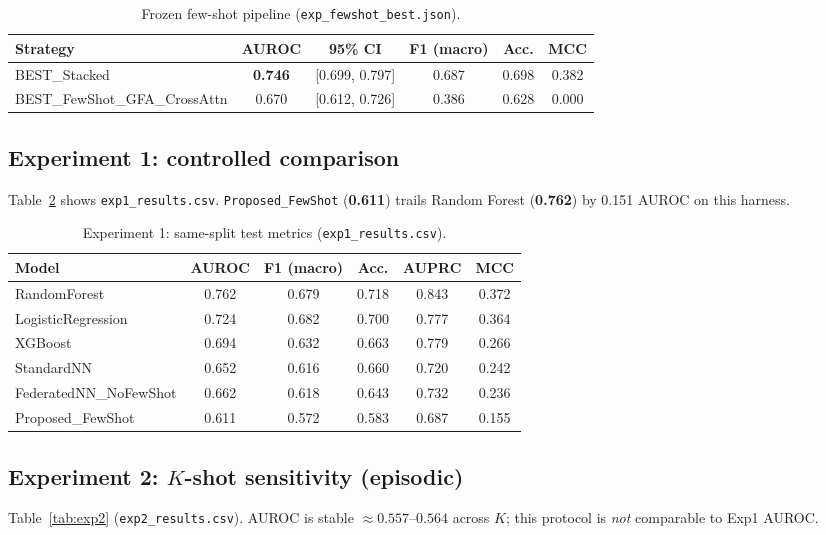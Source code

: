 \begin{table}[htbp]
  \centering
  \caption{Frozen few-shot pipeline (\texttt{exp\_fewshot\_best.json}).}
  \label{tab:fewshot_best}
  \begin{tabular}{lccccc}
    \toprule
    Strategy & AUROC & 95\% CI & F1 (macro) & Acc. & MCC \\
    \midrule
    BEST\_Stacked & \textbf{0.746} & [0.699, 0.797] & 0.687 & 0.698 & 0.382 \\
    BEST\_FewShot\_GFA\_CrossAttn & 0.670 & [0.612, 0.726] & 0.386 & 0.628 & 0.000 \\
    \bottomrule
  \end{tabular}
\end{table}

\subsection{Experiment 1: controlled comparison}
Table~\ref{tab:exp1} shows \texttt{exp1\_results.csv}. \texttt{Proposed\_FewShot} (\textbf{0.611}) trails Random Forest (\textbf{0.762}) by 0.151 AUROC on this harness.

\begin{table}[htbp]
  \centering
  \caption{Experiment 1: same-split test metrics (\texttt{exp1\_results.csv}).}
  \label{tab:exp1}
  \small
  \begin{tabular}{lccccc}
    \toprule
    Model & AUROC & F1 (macro) & Acc. & AUPRC & MCC \\
    \midrule
    RandomForest & 0.762 & 0.679 & 0.718 & 0.843 & 0.372 \\
    LogisticRegression & 0.724 & 0.682 & 0.700 & 0.777 & 0.364 \\
    XGBoost & 0.694 & 0.632 & 0.663 & 0.779 & 0.266 \\
    StandardNN & 0.652 & 0.616 & 0.660 & 0.720 & 0.242 \\
    FederatedNN\_NoFewShot & 0.662 & 0.618 & 0.643 & 0.732 & 0.236 \\
    Proposed\_FewShot & 0.611 & 0.572 & 0.583 & 0.687 & 0.155 \\
    \bottomrule
  \end{tabular}
\end{table}

\subsection{Experiment 2: $K$-shot sensitivity (episodic)}
Table~\ref{tab:exp2} (\texttt{exp2\_results.csv}). AUROC is stable $\approx 0.557$--$0.564$ across $K$; this protocol is \emph{not} comparable to Exp1 AUROC.

